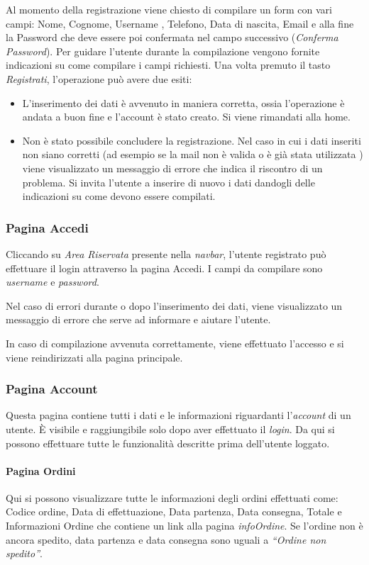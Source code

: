 Al momento della registrazione viene chiesto di compilare un form con vari campi: Nome, Cognome, Username , Telefono, Data di nascita, Email e alla fine la Password che deve essere poi confermata nel campo successivo (\textit{Conferma Password}). Per guidare l’utente durante la compilazione vengono fornite indicazioni su come compilare i campi richiesti. Una volta premuto il tasto \textit{Registrati}, l’operazione può avere due esiti:
\begin{itemize}
	\item L’inserimento dei dati è avvenuto in maniera corretta, ossia l’operazione è andata a buon fine e l’account è stato creato. Si viene rimandati alla home.
	\item Non è stato possibile concludere la registrazione. Nel caso in cui i dati inseriti non siano corretti (ad esempio se la mail non è valida o è già stata utilizzata ) viene visualizzato un messaggio di errore che indica il riscontro di un problema. Si invita l’utente a inserire di nuovo i dati dandogli delle indicazioni su come devono essere compilati.
\end{itemize}

\subsubsection{Pagina Accedi}
Cliccando su \textit{Area Riservata} presente nella \textit{navbar}, l’utente registrato può effettuare il login attraverso la pagina Accedi. I campi da compilare sono \textit{username} e \textit{password}.

Nel caso di errori durante o dopo l’inserimento dei dati, viene visualizzato un messaggio di errore che serve ad informare e aiutare l’utente.

In caso di compilazione avvenuta correttamente, viene effettuato l’accesso e si viene reindirizzati alla pagina principale.

\subsubsection{Pagina Account}
Questa pagina contiene tutti i dati e le informazioni riguardanti l’\textit{account} di un utente. È visibile e raggiungibile solo dopo aver effettuato il \textit{login}. Da qui si possono effettuare tutte le funzionalità descritte prima dell'utente loggato.

\paragraph{Pagina Ordini}
Qui si possono visualizzare tutte le informazioni degli ordini effettuati come: Codice ordine, Data di effettuazione, Data partenza, Data consegna, Totale e Informazioni Ordine che contiene un link alla pagina \textit{infoOrdine}. Se l’ordine non è ancora spedito, data partenza e data consegna sono uguali a \textit{“Ordine non spedito”}.

